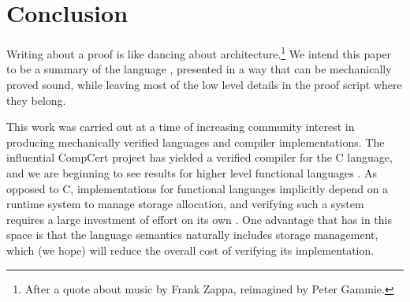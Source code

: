 \section{Conclusion}
Writing about a proof is like dancing about architecture.\footnote{After a quote about music by Frank Zappa, reimagined by Peter Gammie.} We intend this paper to be a summary of the language \SystemFre, presented in a way that can be mechanically proved sound, while leaving most of the low level details in the proof script where they belong.

This work was carried out at a time of increasing community interest in producing mechanically verified languages and compiler implementations. The influential CompCert project \cite{Leroy:compcert} has yielded a verified compiler for the C language, and we are beginning to see results for higher level functional languages \cite{Chlipala:certified-untyped, Chlipala:verified-impure}. As opposed to C, implementations for functional languages implicitly depend on a runtime system to manage storage allocation, and verifying such a system requires a large investment of effort on its own \cite{Hawblitzel:garbage}. One advantage that \SystemFre has in this space is that the language semantics naturally includes storage management, which (we hope) will reduce the overall cost of verifying its implementation. 

